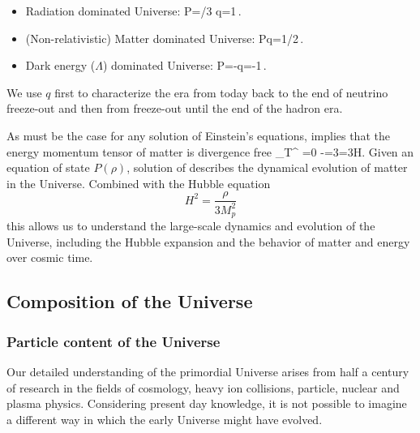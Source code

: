 \begin{itemize}
\item Radiation dominated Universe: 
P=\rho/3 \implies q=1\,.
\eeqn
\item (Non-relativistic) Matter dominated Universe: 
P\ll\rho \implies q=1/2\,.
\eeqn
\item Dark energy ($\Lambda$) dominated Universe: 
P=-\rho \implies q=-1\,.
\eeqn
\end{itemize}
We use $q$ first to characterize the era from today back to the end of neutrino freeze-out and then from freeze-out until the end of the hadron era.

As must be the case for any solution of Einstein's equations,  implies that the energy momentum tensor of matter is divergence free
\beqn\label{divTmn}
\nabla_\nu T^{\mu\nu} =0 \Rightarrow -=3=3H.
\eeqn
 Given an equation of state $P(\rho)$, solution of  describes the dynamical evolution of matter in the Universe. Combined with the Hubble equation
\begin{equation}\label{Hubble_eq}
H^2=\frac{\rho}{3M_p^2}
\end{equation}
this allows us to understand the large-scale dynamics and evolution of the Universe, including the Hubble expansion and the behavior of matter and energy over cosmic time.

\subsection{Composition of the Universe}
\subsubsection{Particle content of the Universe}\label{ssec:ParticleU}
Our detailed understanding of the primordial Universe arises from half a century of research in the fields of cosmology, heavy ion collisions, particle, nuclear and plasma physics. Considering present day knowledge, it is not possible to imagine a different way in which the early Universe might have evolved. 

